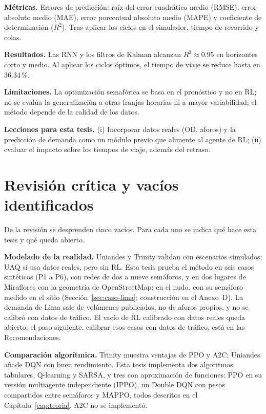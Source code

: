 \noindent\textbf{Métricas.} Errores de predicción: raíz del error cuadrático medio (RMSE), error absoluto medio (MAE), error porcentual absoluto medio (MAPE) y coeficiente de determinación ($R^2$). Tras aplicar los ciclos en el simulador, tiempo de recorrido y colas.

\noindent\textbf{Resultados.} Las RNN y los filtros de Kalman alcanzan $R^2 \approx 0.95$ en horizontes corto y medio. Al aplicar los ciclos óptimos, el tiempo de viaje se reduce hasta en 36.34\,\%.

\noindent\textbf{Limitaciones.} La optimización semafórica se basa en el pronóstico y no en RL; no se evalúa la generalización a otras franjas horarias ni a mayor variabilidad; el método depende de la calidad de los datos.

\noindent\textbf{Lecciones para esta tesis.} (i) Incorporar datos reales (OD, aforos) y la predicción de demanda como un módulo previo que alimente al agente de RL; (ii) evaluar el impacto sobre los tiempos de viaje, además del retraso.

\section{Revisión crítica y vacíos identificados}
\label{sec:revision-critica}

De la revisión se desprenden cinco vacíos. Para cada uno se indica qué hace esta tesis y qué queda abierto.

\noindent\textbf{Modelado de la realidad.} Uniandes y Trinity validan con escenarios simulados; UAQ sí usa datos reales, pero sin RL. Esta tesis prueba el método en seis casos sintéticos (P1 a P6), con redes de dos a nueve semáforos, y en dos lugares de Miraflores con la geometría de OpenStreetMap; en el nudo, con su semáforo medido en el sitio (Sección~\ref{sec:caso-lima}; construcción en el Anexo~D). La demanda de Lima sale de volúmenes publicados, no de aforos propios, y no se calibró con datos de tráfico. El vacío de RL calibrado con datos reales queda abierto; el paso siguiente, calibrar esos casos con datos de tráfico, está en las Recomendaciones.

\noindent\textbf{Comparación algorítmica.} Trinity muestra ventajas de PPO y A2C; Uniandes añade DQN con buen rendimiento. Esta tesis implementa dos algoritmos tabulares, Q-learning y SARSA, y tres con aproximación de funciones: PPO en su versión multiagente independiente (IPPO), un Double DQN con pesos compartidos entre semáforos y MAPPO, todos descritos en el Capítulo~\ref{cap:teoria}. A2C no se implementó.

